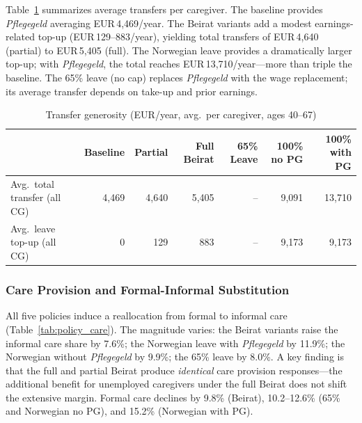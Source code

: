 Table~\ref{tab:policy_transfers} summarizes average transfers per caregiver. The baseline provides \textit{Pflegegeld} averaging EUR\,4,469/year. The Beirat variants add a modest earnings-related top-up (EUR\,129--883/year), yielding total transfers of EUR\,4,640 (partial) to EUR\,5,405 (full). The Norwegian leave provides a dramatically larger top-up; with \textit{Pflegegeld}, the total reaches EUR\,13,710/year---more than triple the baseline. The 65\% leave (no cap) replaces \textit{Pflegegeld} with the wage replacement; its average transfer depends on take-up and prior earnings.

\begin{table}[htbp]
  \centering
  \caption{Transfer generosity (EUR/year, avg.\ per caregiver, ages 40--67)}
  \label{tab:policy_transfers}
  \small
  \begin{tabular}{lrrrrrr}
    \toprule
    & Baseline & Partial & Full Beirat & 65\% Leave & 100\% no PG & 100\% with PG \\
    \midrule
    Avg.\ total transfer (all CG) & 4,469 & 4,640 & 5,405 & -- & 9,091 & 13,710 \\
    Avg.\ leave top-up (all CG) & 0 & 129 & 883 & -- & 9,173 & 9,173 \\
    \bottomrule
  \end{tabular}
\end{table}

\subsubsection{Care Provision and Formal-Informal Substitution}

All five policies induce a reallocation from formal to informal care (Table~\ref{tab:policy_care}). The magnitude varies: the Beirat variants raise the informal care share by 7.6\%; the Norwegian leave with \textit{Pflegegeld} by 11.9\%; the Norwegian without \textit{Pflegegeld} by 9.9\%; the 65\% leave by 8.0\%. A key finding is that the full and partial Beirat produce \textit{identical} care provision responses---the additional benefit for unemployed caregivers under the full Beirat does not shift the extensive margin. Formal care declines by 9.8\% (Beirat), 10.2--12.6\% (65\% and Norwegian no PG), and 15.2\% (Norwegian with PG).

